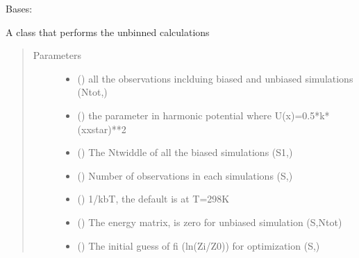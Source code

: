 \documentclass[letterpaper,10pt,english]{sphinxmanual}
\begin{document}
\begin{fulllineitems}
\label{\detokenize{wham:wham.Uwham.Uwham}}
Bases: 

A class that performs the unbinned calculations
\begin{quote}\begin{description}
\item[{Parameters}] \leavevmode\begin{itemize}
\item {} 
 () \textendash{} all the observations inclduing biased and unbiased simulations (Ntot,)

\item {} 
 () \textendash{} the parameter in harmonic potential where U(x)=0.5*k*(x\sphinxhyphen{}xstar)**2

\item {} 
 () \textendash{} The Ntwiddle of all the biased simulations (S\sphinxhyphen{}1,)

\item {} 
 () \textendash{} Number of observations in each simulations (S,)

\item {} 
 () \textendash{} 1/kbT, the default is at T=298K

\item {} 
 () \textendash{} The energy matrix, is zero for unbiased simulation (S,Ntot)

\item {} 
 () \textendash{} The initial guess of fi (\sphinxhyphen{}ln(Zi/Z0)) for optimization (S,)

\end{itemize}


\end{description}
\end{quote}
\end{fulllineitems}
\end{document}
